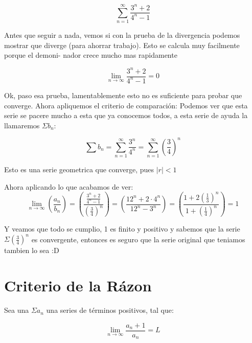 \documentclass[12pt]{article}							    %
\begin{document}
\begin{equation*}
    \sum_{n=1}^{\infty} \frac{3^n+2}{4^n-1}
\end{equation*}

Antes que seguir a nada, vemos si con la prueba de la divergencia podemos mostrar que diverge (para ahorrar trabajo). Esto se calcula muy facilmente porque el demoni- nador crece mucho mas rapidamente

\begin{equation*}
    \lim_{n \to \infty}  \frac{3^n+2}{4^n-1} = 0
\end{equation*}


Ok, paso esa prueba, lamentablemente esto no es
suficiente para probar que converge.
Ahora apliquemos el criterio de comparación: Podemos ver que esta serie se pacere mucho a esta que ya conocemos todos, a esta serie de ayuda la llamaremos $\Sigma b_n$:

\begin{equation*}
    \sum b_n = \sum_{n=1}^{\infty} \frac{3^n}{4^n} = \sum_{n=1}^{\infty} \left( \frac{3}{4} \right)^n 
\end{equation*}

Esto es una serie geometrica que converge, pues $|r| < 1$

Ahora aplicando lo que acabamos de ver:
\begin{equation*}
    \lim_{n \to \infty} \left( \frac{a_n}{b_n} \right) = \left( \frac{ \frac{3^n+2}{4^n-1} }{ \left( \frac{3}{4} \right)^n  } \right) =  \left( \frac{12^n + 2 \cdot 4^n}{12^n -3^n} \right) = \left( \frac{1 + 2 (\frac{1}{3})^n}{1 +  (\frac{1}{4})^n} \right) = 1
\end{equation*}

Y veamos que todo se cumplio, 1 es finito y positivo y sabemos que la serie $\Sigma (\frac{3}{4})^n$ es convergente, entonces es seguro que la serie original que teniamos tambien lo sea :D



\section{Criterio de la Rázon}

Sea una $\Sigma a_n$ una series de términos positivos, tal que:

\begin{equation}
    \lim_{n \to \infty} \frac{a_n+1}{a_n} = L
\end{equation}
\end{document}
